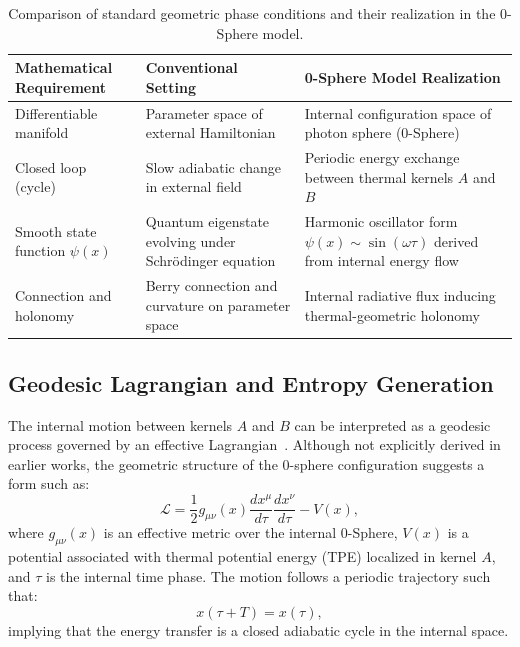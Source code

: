\documentclass[%
 reprint,
 amsmath,amssymb,
 aps,
]{revtex4-1}
\numberwithin{equation}{section}%
\begin{document}
\begin{table}[t!]
\centering
\caption{Comparison of standard geometric phase conditions and their realization in the 0-Sphere model.}
\label{tab:geometry_summary}
\renewcommand{\arraystretch}{1.4}
\begin{tabular}{p{5.0cm}p{5.5cm}p{5.5cm}}
\toprule
\textbf{Mathematical Requirement} & \textbf{Conventional Setting} & \textbf{0-Sphere Model Realization} \\
\midrule
Differentiable manifold & Parameter space of external Hamiltonian & Internal configuration space of photon sphere (0-Sphere) \\
\addlinespace[0.3cm]
Closed loop (cycle) & Slow adiabatic change in external field & Periodic energy exchange between thermal kernels $A$ and $B$ \\
\addlinespace[0.3cm]
Smooth state function $\psi(x)$ & Quantum eigenstate evolving under Schrödinger equation & Harmonic oscillator form $\psi(x) \sim \sin(\omega \tau)$ derived from internal energy flow~\cite{hanamura1811.0312} \\
\addlinespace[0.3cm]
Connection and holonomy & Berry connection and curvature on parameter space & Internal radiative flux inducing thermal-geometric holonomy \\
\bottomrule
\end{tabular}
\end{table}


\subsection{Geodesic Lagrangian and Entropy Generation} \label{subsec:geodesic_lagrangian}

The internal motion between kernels $A$ and $B$ can be interpreted as a geodesic process governed by an effective Lagrangian~\cite{hanamura2506.0119}. Although not explicitly derived in earlier works, the geometric structure of the 0-sphere configuration suggests a form such as:
\begin{equation}
\mathcal{L} = \frac{1}{2} g_{\mu\nu}(x) \frac{dx^\mu}{d\tau} \frac{dx^\nu}{d\tau} - V(x), \label{eq:geo_lagrangian}
\end{equation}
where $g_{\mu\nu}(x)$ is an effective metric over the internal 0-Sphere, $V(x)$ is a potential associated with thermal potential energy (TPE) localized in kernel $A$, and $\tau$ is the internal time phase. The motion follows a periodic trajectory such that:
\begin{equation}
x(\tau + T) = x(\tau), \label{eq:cycle}
\end{equation}
implying that the energy transfer is a closed adiabatic cycle in the internal space.
\end{document}
